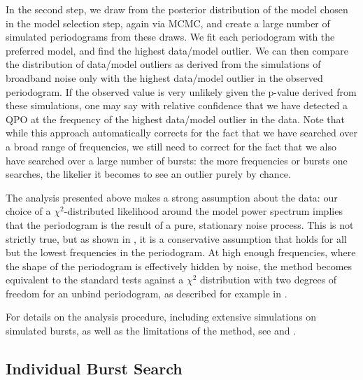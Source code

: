 \documentclass[numberedappendix]{emulateapj}
\begin{document}
In the second step, we draw from the posterior distribution of the model chosen in the model selection step, again via MCMC, and create a large number of simulated periodograms from these draws. We fit each periodogram with the preferred model, and find the highest data/model outlier. We can then compare the distribution of data/model outliers as derived from the simulations of broadband noise only with the highest data/model outlier in the observed periodogram. If the observed value is very unlikely given the p-value derived from these simulations, one may say with relative confidence that we have detected a QPO at the frequency of the highest data/model outlier in the data. Note that while this approach automatically corrects for the fact that we have searched over a broad range of frequencies, we still need to correct for the fact that we also have searched over a large number of bursts: the more frequencies or bursts one searches, the likelier it becomes to see an outlier purely by chance. 

The analysis presented above makes a strong assumption about the data: our choice of a $\chi^2$-distributed likelihood around the model power spectrum implies that the periodogram is the result of a pure, stationary noise process. This is not strictly true, but as shown in \citet{huppenkothen2013}, it is a conservative assumption that holds for all but the lowest frequencies in the periodogram. At high enough frequencies, where the shape of the periodogram is effectively hidden by noise, the method becomes equivalent to the standard tests against a $\chi^2$ distribution with two degrees of freedom for an unbind periodogram, as described for example in \citet{vanderklis1989}.

For details on the analysis procedure, including extensive simulations on simulated bursts, as well as the limitations of the method, see \citet{huppenkothen2013} and \citet{vaughan2010}.

\subsection{Individual Burst Search}
\label{sec:psd_individual}
\end{document}
